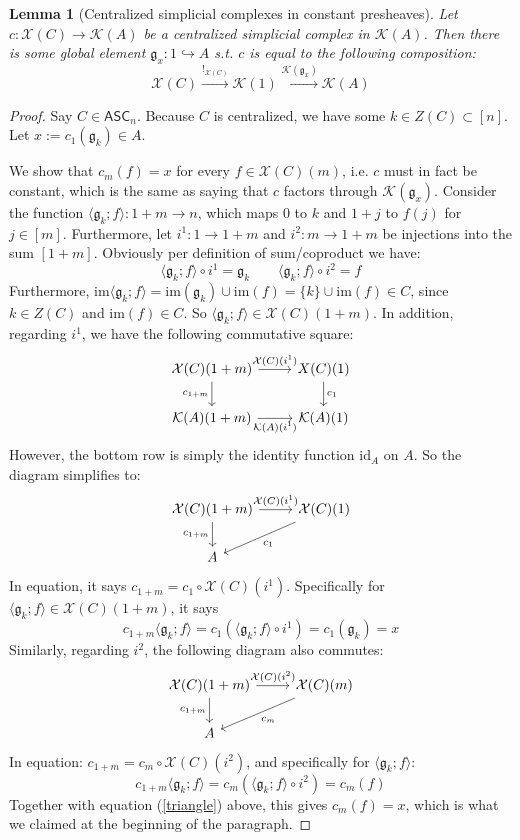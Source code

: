 \documentclass{article}
\newtheorem{lemma}{Lemma}[subsection]
\theoremstyle{remark}
\theoremstyle{definition}
\newcommand{\ASC}{\mathsf{ASC}}
\newcommand{\im}{\mathrm{im}}
\newcommand{\id}{\mathrm{id}}
\newcommand{\X}{\mathcal X}
\newcommand{\K}{\mathcal K}
\newcommand{\g}{\mathfrak g}
\begin{document}
	\begin{lemma}[Centralized simplicial complexes in constant presheaves]\label{cscK}
		Let $c:\X(C)\to\K(A)$ be a centralized simplicial complex in $\K(A)$. Then there is some global element $\g_x:1\hookrightarrow A$ s.t. $c$ is equal to the following composition:
		\[\X(C)\xrightarrow{!_{\X(C)}}\K(1)\xrightarrow{\K(\g_x)}\K(A)\]
	\end{lemma}
	\begin{proof}
		Say $C\in\ASC_n$. Because $C$ is centralized, we have some $k\in Z(C)\subset[n]$. Let $x:=c_1(\g_k)\in A$.
		
		We show that $c_m(f)=x$ for every $f\in\X(C)(m)$, i.e. $c$ must in fact be constant, which is the same as saying that $c$ factors through $\K(\g_x)$. Consider the function $\langle\g_k;f\rangle:1+m\to n$, which maps 0 to $k$ and $1+j$ to $f(j)$ for $j\in[m]$. Furthermore, let $i^1:1\to1+m$ and $i^2:m\to1+m$ be injections into the sum $[1+m]$. Obviously per definition of sum/coproduct we have:
		\[\langle\g_k;f\rangle\circ i^1=\g_k\qquad\langle\g_k;f\rangle\circ i^2=f\]
		Furthermore, $\im\langle\g_k;f\rangle=\im(\g_k)\cup\im(f)=\{k\}\cup\im(f)\in C$, since $k\in Z(C)$ and $\im(f)\in C$. So $\langle\g_k;f\rangle\in\X(C)(1+m)$. In addition, regarding $i^1$, we have the following commutative square:
		\[\begin{tikzcd}
			\X(C)(1+m)\arrow{r}{\X(C)(i^1)}\arrow{d}[swap]{c_{1+m}}&X(C)(1)\arrow{d}{c_1}\\
			\K(A)(1+m)\arrow{r}[swap]{\K(A)(i^1)}&\K(A)(1)
		\end{tikzcd}\]
		However, the bottom row is simply the identity function $\id_A$ on $A$. So the diagram simplifies to:
		\[\begin{tikzcd}
			\X(C)(1+m)\arrow{r}{\X(C)(i^1)}\arrow{d}[swap]{c_{1+m}}&\X(C)(1)\arrow{dl}{c_1}\\
			A
		\end{tikzcd}\]
		In equation, it says $c_{1+m}=c_1\circ\X(C)(i^1)$. Specifically for $\langle\g_k;f\rangle\in\X(C)(1+m)$, it says
		\begin{equation}\label{triangle}
			c_{1+m}\langle\g_k;f\rangle=c_1(\langle\g_k;f\rangle\circ i^1)=c_1(\g_k)=x
		\end{equation}
		Similarly, regarding $i^2$, the following diagram also commutes:
		\[\begin{tikzcd}
			\X(C)(1+m)\arrow{r}{\X(C)(i^2)}\arrow{d}[swap]{c_{1+m}}&\X(C)(m)\arrow{dl}{c_m}\\
			A
		\end{tikzcd}\]
		In equation: $c_{1+m}=c_m\circ\X(C)(i^2)$, and specifically for $\langle\g_k;f\rangle$:
		\[c_{1+m}\langle\g_k;f\rangle=c_m(\langle\g_k;f\rangle\circ i^2)=c_m(f)\]
		Together with equation (\ref{triangle}) above, this gives $c_m(f)=x$, which is what we claimed at the beginning of the paragraph.
	\end{proof}
\end{document}
